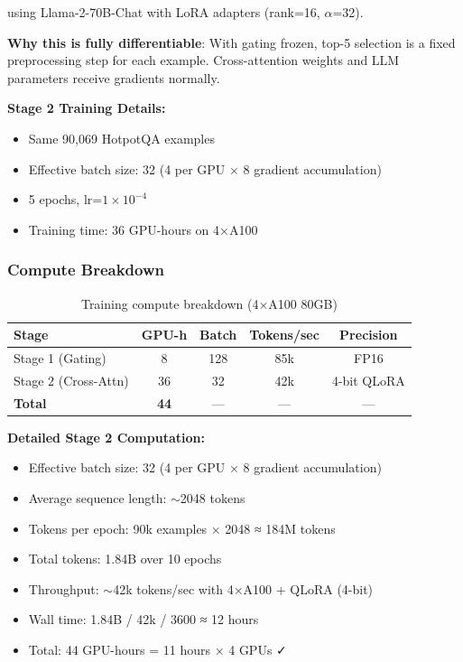 \documentclass[10pt,twocolumn]{article}
\begin{document}
using Llama-2-70B-Chat with LoRA adapters \cite{hu2022lora} (rank=16, $\alpha$=32).

\textbf{Why this is fully differentiable}: With gating frozen, top-5 selection is a fixed preprocessing step for each example. Cross-attention weights and LLM parameters receive gradients normally.

\textbf{Stage 2 Training Details:}
\begin{itemize}
    \item Same 90,069 HotpotQA examples
    \item Effective batch size: 32 (4 per GPU × 8 gradient accumulation)
    \item 5 epochs, lr=$1 \times 10^{-4}$
    \item Training time: 36 GPU-hours on 4×A100
\end{itemize}


\subsubsection{Compute Breakdown}
\label{sec:compute}

\begin{table}[h]
\centering
\caption{Training compute breakdown (4×A100 80GB)}
\label{tab:compute}
\small
\begin{tabular}{@{}lcccc@{}}
\toprule
\textbf{Stage} & \textbf{GPU-h} & \textbf{Batch} & \textbf{Tokens/sec} & \textbf{Precision} \\
\midrule
Stage 1 (Gating) & 8 & 128 & 85k & FP16 \\
Stage 2 (Cross-Attn) & 36 & 32 & 42k & 4-bit QLoRA \\
\midrule
\textbf{Total} & \textbf{44} & --- & --- & --- \\
\bottomrule
\end{tabular}
\end{table}

\textbf{Detailed Stage 2 Computation:}
\begin{itemize}
    \item Effective batch size: 32 (4 per GPU × 8 gradient accumulation)
    \item Average sequence length: $\sim$2048 tokens
    \item Tokens per epoch: 90k examples × 2048 ≈ 184M tokens
    \item Total tokens: 1.84B over 10 epochs
    \item Throughput: $\sim$42k tokens/sec with 4×A100 + QLoRA (4-bit)
    \item Wall time: 1.84B / 42k / 3600 ≈ 12 hours
    \item Total: 44 GPU-hours = 11 hours × 4 GPUs ✓
\end{itemize}
\end{document}
